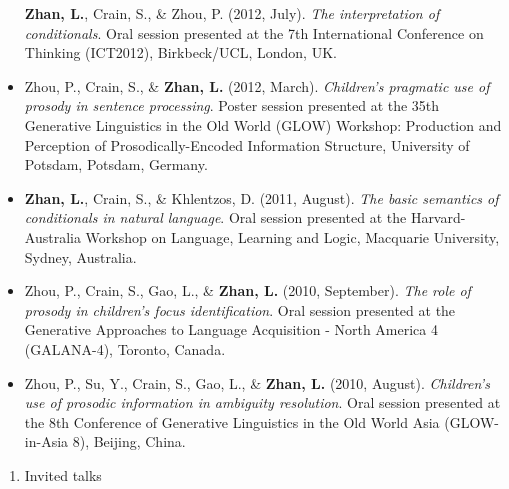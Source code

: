 \documentclass[
  12pt,
]{article}
\providecommand{\tightlist}{%
  \setlength{\itemsep}{0pt}\setlength{\parskip}{0pt}}
\begin{document}
\begin{itemize}
  \textbf{Zhan, L.}, Crain, S., \& Zhou, P. (2012, July). \emph{The
  interpretation of conditionals}. Oral session presented at the 7th
  International Conference on Thinking (ICT2012), Birkbeck/UCL, London,
  UK.
\item
  Zhou, P., Crain, S., \& \textbf{Zhan, L.} (2012, March).
  \emph{Children's pragmatic use of prosody in sentence processing}.
  Poster session presented at the 35th Generative Linguistics in the Old
  World (GLOW) Workshop: Production and Perception of
  Prosodically-Encoded Information Structure, University of Potsdam,
  Potsdam, Germany.
\item
  \textbf{Zhan, L.}, Crain, S., \& Khlentzos, D. (2011, August).
  \emph{The basic semantics of conditionals in natural language}. Oral
  session presented at the Harvard-Australia Workshop on Language,
  Learning and Logic, Macquarie University, Sydney, Australia.
\item
  Zhou, P., Crain, S., Gao, L., \& \textbf{Zhan, L.} (2010, September).
  \emph{The role of prosody in children's focus identification}. Oral
  session presented at the Generative Approaches to Language Acquisition
  - North America 4 (GALANA-4), Toronto, Canada.
\item
  Zhou, P., Su, Y., Crain, S., Gao, L., \& \textbf{Zhan, L.} (2010,
  August). \emph{Children's use of prosodic information in ambiguity
  resolution}. Oral session presented at the 8th Conference of
  Generative Linguistics in the Old World Asia (GLOW-in-Asia 8),
  Beijing, China.
\end{itemize}

\begin{enumerate}
\def\labelenumi{\arabic{enumi}.}
\setcounter{enumi}{4}
\tightlist
\item
  Invited talks
\end{enumerate}
\end{document}

